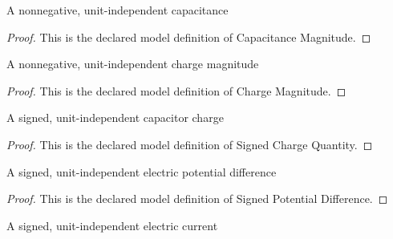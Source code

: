 \begin{definition}
  \label{def:physics:phyx-mini-0978:phyxminiproblems-problemphyxmini0978-capacitancemagnitude}
  A nonnegative, unit-independent capacitance
\end{definition}
\begin{proof}
  This is the declared model definition of Capacitance Magnitude.
\end{proof}
\begin{definition}
  \label{def:physics:phyx-mini-0978:phyxminiproblems-problemphyxmini0978-chargemagnitude}
  A nonnegative, unit-independent charge magnitude
\end{definition}
\begin{proof}
  This is the declared model definition of Charge Magnitude.
\end{proof}
\begin{definition}
  \label{def:physics:phyx-mini-0978:phyxminiproblems-problemphyxmini0978-signedchargequantity}
  A signed, unit-independent capacitor charge
\end{definition}
\begin{proof}
  This is the declared model definition of Signed Charge Quantity.
\end{proof}
\begin{definition}
  \label{def:physics:phyx-mini-0978:phyxminiproblems-problemphyxmini0978-signedpotentialdifference}
  A signed, unit-independent electric potential difference
\end{definition}
\begin{proof}
  This is the declared model definition of Signed Potential Difference.
\end{proof}
\begin{definition}
  \label{def:physics:phyx-mini-0978:phyxminiproblems-problemphyxmini0978-signedcurrentquantity}
  A signed, unit-independent electric current
\end{definition}
